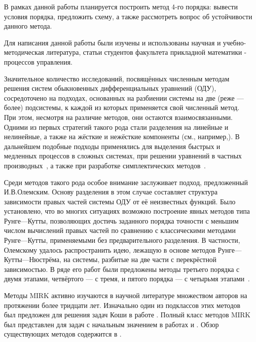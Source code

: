 \documentclass[a4paper,article,14pt]{extarticle}
\begin{document}
В рамках данной работы планируется построить метод 4-го порядка: вывести условия порядка, предложить схему, а также рассмотреть вопрос об устойчивости данного метода. 
\pagebreak

Для написания данной работы были изучены и использованы научная и учебно-методическая литература, статьи студентов факультета прикладной математики - процессов управления.

Значительное количество исследований, посвящённых численным методам решения систем обыкновенных дифференциальных уравнений (ОДУ), сосредоточено на подходах, основанных на разбиении системы на две (реже — более) подсистемы, к каждой из которых применяется свой численный метод. При этом, несмотря на различие методов, они остаются взаимосвязанными. Одними из первых стратегий такого рода стали разделения на линейные и нелинейные, а также на жёсткие и нежёсткие компоненты (см., например,\cite{Hofer1976}). В дальнейшем подобные подходы применялись для выделения быстрых и медленных процессов в сложных системах\cite{ShomeEtAl2004, SanduGuenther2016}, при решении уравнений в частных производных~\cite{KetchesonEtAl2016}, а также при разработке симплектических методов~\cite{KalogiratouEtAl2011}.

Среди методов такого рода особое внимание заслуживает подход, предложенный И.В.Олемским. Основу разделения в этом случае составляет структура зависимости правых частей системы ОДУ от её неизвестных функций. Было установлено, что во многих ситуациях возможно построение явных методов типа Рунге—Кутты, позволяющих достичь заданного порядка точности с меньшим числом вычислений правых частей по сравнению с классическими методами Рунге—Кутты, применяемыми без предварительного разделения. В частности, Олемскому удалось распространить идею, лежащую в основе методов Рунге—Кутты—Нюстрёма\cite{tree}, на системы, разбитые на две части с перекрёстной зависимостью. В ряде его работ были предложены методы третьего порядка с двумя этапами, четвёртого — с тремя\cite{Olemskoy2003}, и пятого порядка — с четырьмя этапами~\cite{Olemskoy2002}.

Методы MIRK активно изучаются в научной литературе множеством авторов на протяжении более тридцати лет. Изначально один из подклассов этих методов был предложен для решения задач Коши в работе \cite{Cash1975}. Полный класс методов MIRK был представлен для задач с начальным значением в работах \cite{Bokhoven1980} и \cite{Cash1982}. Обзор существующих методов содержится в \cite{Muir1987}.
\end{document}
